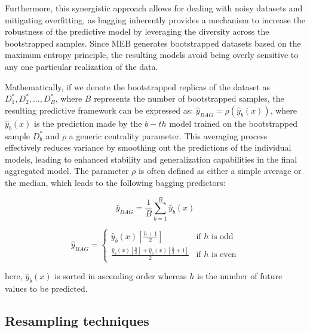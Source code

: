 \documentclass[opre,sglanonrev,11pt]{informs4}
\begin{document}
Furthermore, this synergistic approach allows for dealing with noisy datasets and mitigating overfitting, as bagging inherently provides a mechanism to increase the robustness of the predictive model by leveraging the diversity across the bootstrapped samples. Since MEB generates bootstrapped datasets based on the maximum entropy principle, the resulting models avoid being overly sensitive to any one particular realization of the data.

Mathematically, if we denote the bootstrapped replicas of the dataset as $D^*_1, D^*_2, \ldots, D^*_B$, where $B$  represents the number of bootstrapped samples, the resulting predictive framework can be expressed as:  $\hat{y}_{\textit{BAG}} = \rho( \hat{y}_{b}(x) )$, where $\hat{y}_{b}(x)$ is the prediction made by the $b-th$ model trained on the bootstrapped sample $ D^*_b $  and $\rho$ a generic centrality parameter. 
This averaging process effectively reduces variance by smoothing out the predictions of the individual models, leading to enhanced stability and generalization capabilities in the final aggregated model.  The parameter $\rho$ is often defined as either a simple average or the median, which leads to the following bagging predictors:

\begin{equation}
	\hat{y}_{\textit{BAG}}  = \frac{1}{B} \sum_{b=1}^{B} \hat{y}_{b}(x)
\end{equation}

\begin{equation}
	\hat{y}_{\textit{BAG}}  = 
	\begin{cases} 
		\hat{y}_{b}(x) \left[\frac{h+1}{2}\right] & \text{if } h \text{ is odd} \\ 
		\frac{\hat{y}_{b}(x)\left[\frac{h}{2}\right] + \hat{y}_{b}(x)\left[\frac{h}{2} + 1\right]}{2} & \text{if } h \text{ is even} 
	\end{cases}
\end{equation}

here, $\hat{y}_{b}(x)$  is  sorted in ascending order whereas $h$ is the number of future values to be predicted.

\subsection{Resampling techniques} \label{Subsec:resampling}
\end{document}

